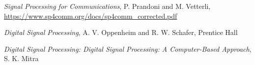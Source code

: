
\cleardoublepage
{}
\begin{thebibliography}{99}

\textit{Signal Processing for Communications},
P. Prandoni and M. Vetterli,
\url{https://www.sp4comm.org/docs/sp4comm_corrected.pdf}

\textit{Digital Signal Processing},
A. V. Oppenheim and R. W. Schafer,
Prentice Hall

\textit{Digital Signal Processing: Digital Signal Processing: A Computer-Based Approach},
S. K. Mitra

\end{thebibliography}
